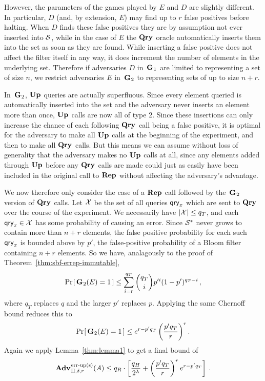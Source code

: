 However, the parameters of the games played by $E$ and $D$ are slightly
different. In particular, $D$ (and, by extension, $E$) may find up to $r$
false positives before halting. When $D$ finds these false positives they
are by assumption not ever inserted into $\mathcal{S}$, while in the case of $E$ the
$\textup{\textbf{Qry}}\hspace{0.5pt}$ oracle automatically inserts them into the set as soon as they are
found. While inserting a false positive does not affect the filter itself in any
way, it does increment the number of elements in the underlying set. Therefore
if adversaries $D$ in~$\textup{\textbf{G}}\hspace{0.5pt}_1$ are limited to representing a set of size
$n$, we restrict adversaries $E$ in~$\textup{\textbf{G}}\hspace{0.5pt}_2$ to representing sets of up to size
$n+r$.

In~$\textup{\textbf{G}}\hspace{0.5pt}_2$, $\textup{\textbf{Up}}\hspace{0.5pt}$ queries are actually superfluous. Since every element
queried is automatically inserted into the set and the adversary never inserts
an element more than once, $\textup{\textbf{Up}}\hspace{0.5pt}$ calls are now all of type 2. Since these
insertions can only increase the chance of each following $\textup{\textbf{Qry}}\hspace{0.5pt}$ call being a
false positive, it is optimal for the adversary to make all $\textup{\textbf{Up}}\hspace{0.5pt}$ calls at the
beginning of the experiment, and then to make all $\textup{\textbf{Qry}}\hspace{0.5pt}$ calls. But this means
we can assume without loss of generality that the adversary makes no $\textup{\textbf{Up}}\hspace{0.5pt}$
calls at all, since any elements added through $\textup{\textbf{Up}}\hspace{0.5pt}$ before any $\textup{\textbf{Qry}}\hspace{0.5pt}$ calls
are made could just as easily have been included in the original call to $\textup{\textbf{Rep}}\hspace{0.5pt}$
without affecting the adversary's advantage.

We now therefore only consider the case of a $\textup{\textbf{Rep}}\hspace{0.5pt}$ call followed by
the~$\textup{\textbf{G}}\hspace{0.5pt}_2$ version of $\textup{\textbf{Qry}}\hspace{0.5pt}$ calls. Let $\mathcal{X}$ be the set of all queries
$\mathsf{qry}_x$ which are sent to $\textup{\textbf{Qry}}\hspace{0.5pt}$ over the course of the experiment. We
necessarily have $|\mathcal{X}| \le q_T$, and each $\mathsf{qry}_x \in \mathcal{X}$ has some
probability of causing an error. Since $\mathcal{S}^*$ never grows to contain more than
$n+r$ elements, the false positive probability for each such $\mathsf{qry}_x$ is bounded
above by $p'$, the false-positive probability of a Bloom filter containing $n+r$
elements. So we have, analagously to the proof of
Theorem~\ref{thm:sbf-errep-immutable},
\begin{equation}
   \Pr\hspace{-1pt}\left[\,\textup{\textbf{G}}\hspace{0.5pt}_2(E)=1\,\right] \le
     \sum_{i=r}^{q_T} \binom{q_T}{i}p'^i(1-p')^{q_T-i} \,,
\end{equation}
where $q_T$ replaces $q$ and the larger $p'$ replaces $p$. Applying the same Chernoff bound reduces this to
\begin{equation}
   \Pr\hspace{-1pt}\left[\,\textup{\textbf{G}}\hspace{0.5pt}_2(E)=1\,\right] \le
     e^{r-p'q_T}\left(\frac{p'q_T}{r}\right)^r.
\end{equation}
%
Again we apply Lemma~\ref{thm:lemma1} to get a final bound of
\begin{equation}
  \Adv{\erreps}_{\Pi,\delta,r}(\advA) \leq
    q_R \cdot \left[
      \frac{q_H}{2^\lambda} +
      \left(\frac{p'q_T}{r}\right)^re^{r-p'q_T}
    \right] \,.
\end{equation}